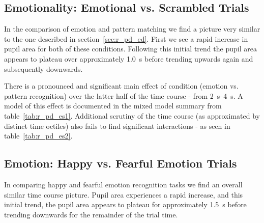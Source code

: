 	\subsection{Emotionality: Emotional vs. Scrambled Trials}\label{sec:r_pd_es}
	    In the comparison of emotion and pattern matching we find a picture very similar to the one described in section~\ref{sec:r_pd_ed}.
	    First we see a rapid increase in pupil area for both of these conditions.
	    Following this initial trend the pupil area appears to plateau over approximately \SI{1.0}{\second} before trending upwards again and subsequently downwards.
	    
	    
	    
	    There is a pronounced and significant main effect of condition (emotion vs. pattern recognition) over the latter half of the time course - from \SIrange{2}{4}{\second}.
	    A model of this effect is documented in the mixed model summary from table~\ref{tab:r_pd_es1}.
	    Additional scrutiny of the time course (as approximated by distinct time octiles) also fails to find significant interactions - as seen in table~\ref{tab:r_pd_es2}.
	\subsection{Emotion: Happy vs. Fearful Emotion Trials}\label{sec:r_pd_hf}
	    
	    In comparing happy and fearful emotion recognition tasks we find an overall similar time course picture.
	    Pupil area experiences a rapid increase,
	    and this initial trend, the pupil area appears to plateau for approximately \SI{1.5}{\second} before trending downwards for the remainder of the trial time.
	    
